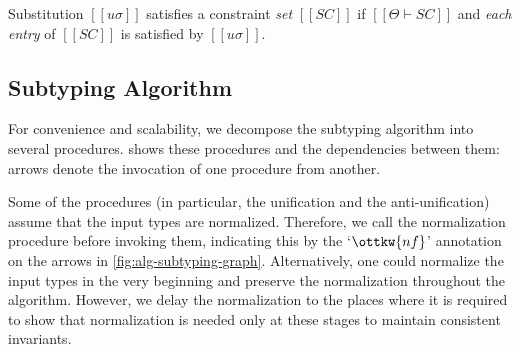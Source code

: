 Substitution $[[uσ]]$ satisfies a constraint \emph{set} $[[SC]]$
if $[[Θ ⊢ SC]]$ and \emph{each entry} of $[[SC]]$ is satisfied by $[[uσ]]$.

\subsection{Subtyping Algorithm}
\label{sec:subtyping-algorithm}
  
  For convenience and scalability, 
  we decompose the subtyping algorithm 
  into several procedures. 
  shows these procedures and the dependencies between them:
  arrows denote the invocation of one procedure from another.

  Some of the procedures (in particular, the unification and the
  anti-unification) assume that the input types are normalized. Therefore, we
  call the normalization procedure before invoking them, indicating this by the
  `$\ottkw{nf}$' annotation on the arrows in \cref{fig:alg-subtyping-graph}.
  Alternatively, one could normalize the input types in the very beginning
  and preserve the normalization throughout the algorithm. However, we
  delay the normalization to the places where it is required to show that
  normalization is needed only at these stages to maintain consistent
  invariants.

